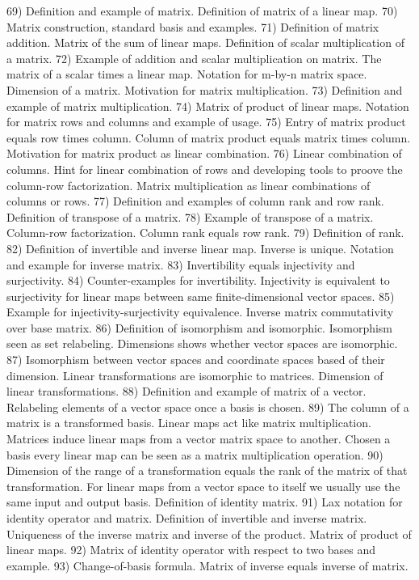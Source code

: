 \begin{multicols}{3}
  69) Definition and example of matrix. Definition of matrix of a linear map.
  70) Matrix construction, standard basis and examples.
  71) Definition of matrix addition. Matrix of the sum of linear maps.
  Definition of scalar multiplication of a matrix.
  72) Example of addition and scalar multiplication on matrix. The matrix of a
  scalar times a linear map. Notation for m-by-n matrix space. Dimension of a
  matrix. Motivation for matrix multiplication.
  73) Definition and example of matrix multiplication.
  74) Matrix of product of linear maps. Notation for matrix rows and columns
  and example of usage.
  75) Entry of matrix product equals row times column. Column of matrix product
  equals matrix times column. Motivation for matrix product as linear
  combination.
  76) Linear combination of columns. Hint for linear combination of rows and
  developing tools to proove the column-row factorization. Matrix
  multiplication as linear combinations of columns or rows.
  77) Definition and examples of column rank and row rank. Definition of
  transpose of a matrix.
  78) Example of transpose of a matrix. Column-row factorization. Column rank
  equals row rank.
  79) Definition of rank.
  82) Definition of invertible and inverse linear map. Inverse is unique.
  Notation and example for inverse matrix.
  83) Invertibility equals injectivity and surjectivity.
  84) Counter-examples for invertibility. Injectivity is equivalent to
  surjectivity for linear maps between same finite-dimensional vector spaces.
  85) Example for injectivity-surjectivity equivalence. Inverse matrix
  commutativity over base matrix.
  86) Definition of isomorphism and isomorphic. Isomorphism seen as set
  relabeling. Dimensions shows whether vector spaces are isomorphic.
  87) Isomorphism between vector spaces and coordinate spaces based of their
  dimension. Linear transformations are isomorphic to matrices. Dimension of
  linear transformations.
  88) Definition and example of matrix of a vector. Relabeling elements of a
  vector space once a basis is chosen.
  89) The column of a matrix is a transformed basis. Linear maps act like
  matrix multiplication. Matrices induce linear maps from a vector matrix space
  to another. Chosen a basis every linear map can be seen as a matrix
  multiplication operation.
  90) Dimension of the range of a transformation equals the rank of the matrix
  of that transformation. For linear maps from a vector space to itself we
  usually use the same input and output basis. Definition of identity matrix.
  91) Lax notation for identity operator and matrix. Definition of invertible
  and inverse matrix. Uniqueness of the inverse matrix and inverse of the
  product. Matrix of product of linear maps.
  92) Matrix of identity operator with respect to two bases and example.
  93) Change-of-basis formula. Matrix of inverse equals inverse of matrix.
\end{multicols}

